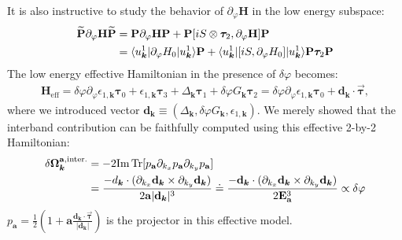 \begin{subappendices}
It is also instructive to study the behavior of $\partial_\varphi\mathbf H$ in the low energy subspace:
\begin{align}
	\widetilde{\mathbf P} \partial_\varphi\mathbf H \widetilde{\mathbf P} &= \mathbf P\partial_\varphi\mathbf H \mathbf P+\mathbf P[iS\otimes\boldsymbol\tau_2,\partial_\varphi\mathbf H]\mathbf P\notag\\
     &=\langle u^1_{\bm{k}}|\partial_\varphi H_0| u^1_{\bm{k}}\rangle\mathbf P +\langle u^1_{\bm{k}}|[iS,\partial_\varphi H_0] |u^1_{\bm{k}}\rangle\mathbf P\boldsymbol\tau_2\mathbf P
\end{align}
The low energy effective Hamiltonian in the presence of $\delta\varphi$ becomes:
\begin{align}
	\mathbf H_{\text{eff}}=\delta\varphi\partial_\varphi\epsilon_{1,\bm{k}}\boldsymbol\tau_0+\epsilon_{1,\bm{k}}\boldsymbol\tau_3+\varDelta_{\bm{k}}\boldsymbol\tau_1+\delta\varphi G_{\bm{k}}\boldsymbol\tau_2=\delta\varphi\partial_\varphi\epsilon_{1,\bm{k}}\boldsymbol\tau_0+\mathbf{d}_{\bm{k}}\cdot\vec{\boldsymbol{\tau}},
\end{align}
where we introduced vector $\mathbf{d}_{\bm{k}}\equiv (\varDelta_{\bm{k}},\delta\varphi G_{\bm{k}},\epsilon_{1,\bm{k}})$. We merely showed that the interband contribution can be faithfully computed using this effective 2-by-2 Hamiltonian:
\begin{align}
	\delta\boldsymbol\Omega^{\mathbf a,\text{inter.}}_{\bm{k}} &= -2\mbox{Im\,Tr}[p_{\mathbf a}\partial_{k_x}p_{\mathbf a}\partial_{k_y}p_{\mathbf a}]\notag\\
    &=\frac{-d_{\bm{k}}\cdot(\partial_{k_x}\mathbf{d}_{\bm{k}} \times \partial_{k_y}\mathbf{d}_{\bm{k}})}{2\mathbf a|\mathbf{d}_{\bm{k}}|^3}\doteq \frac{-\mathbf{d}_{\bm{k}}\cdot(\partial_{k_x}\mathbf{d}_{\bm{k}} \times \partial_{k_y}\mathbf{d}_{\bm{k}})}{2\mathbf E_{\mathbf a}^3}\propto \delta\varphi
\end{align}
$p_{\mathbf a}=\frac{1}{2}(1+\mathbf a \frac{\mathbf{d}_{\bm{k}}\cdot\vec{\boldsymbol\tau}}{|\mathbf{d}_{\bm{k}}|})$ is the projector in this effective model.


\end{subappendices}
